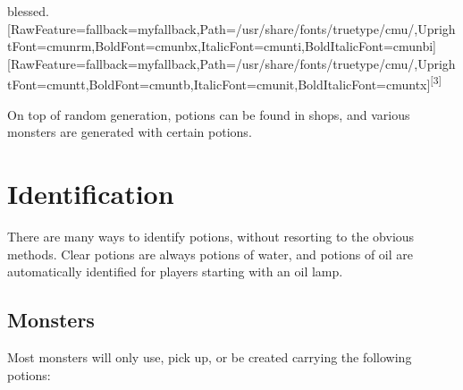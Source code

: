 blessed.\allowbreak{}\setmainfont{cmunrm.ttf}[RawFeature={fallback=myfallback},Path=/usr/share/fonts/truetype/cmu/,UprightFont=cmunrm,BoldFont=cmunbx,ItalicFont=cmunti,BoldItalicFont=cmunbi]\setmonofont{cmunrm.ttf}[RawFeature={fallback=myfallback},Path=/usr/share/fonts/truetype/cmu/,UprightFont=cmuntt,BoldFont=cmuntb,ItalicFont=cmunit,BoldItalicFont=cmuntx]\textsuperscript{{$\text{[}$}3{$\text{]}$}}


On top of random generation, potions can be found in shops\footnotemark[78], and various monsters are generated with\footnotemark[79] certain potions.



\section{Identification}
\label{3}
There are many ways to identify potions, without resorting to the obvious methods\footnotemark[80]. Clear potions are always potions of water, and potions of oil are automatically identified for players starting with an oil lamp\footnotemark[81].



\subsection{Monsters}
\label{4}
Most monsters will only use, pick up, or be created carrying\footnotemark[82] the following potions:





